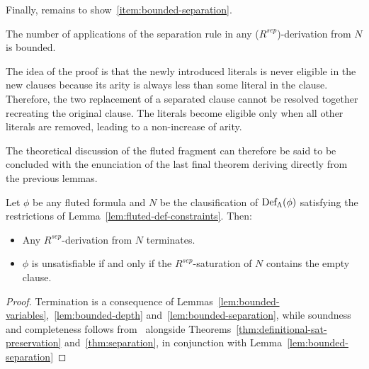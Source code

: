 Finally, remains to show~\ref{item:bounded-separation}.
\begin{lemma}\label{lem:bounded-separation}
  The number of applications of the separation rule in any (\(R^{sep}\))-derivation from \(N\) is bounded.
\end{lemma}

The idea of the proof is that the newly introduced literals is never eligible in the new clauses because its arity is always less than some literal in the clause.
Therefore, the two replacement of a separated clause cannot be resolved together recreating the original clause. The literals become eligible only when all other  literals are removed, leading to a non-increase of arity.

The theoretical discussion of the fluted fragment can therefore be said to be concluded with the enunciation of the last final theorem deriving directly from the previous lemmas.

\begin{theorem}
  Let \(\phi\) be any fluted formula and \(N\) be the clausification of \(\fldef{\Lambda}{\phi}\) satisfying the restrictions of Lemma~\ref{lem:fluted-def-constraints}.
  Then:
  \begin{itemize}
    \item Any \(R^{sep}\)-derivation from \(N\) terminates.
    \item \(\phi\) is unsatisfiable if and only if the \(R^{sep}\)-saturation of \(N\) contains the empty clause.
  \end{itemize}
\end{theorem}

\begin{proof}
  Termination is a consequence of Lemmas~\ref{lem:bounded-variables},~\ref{lem:bounded-depth} and~\ref{lem:bounded-separation}, while soundness and completeness follows from~\cite{robinson1965} alongside Theorems~\ref{thm:definitional-sat-preservation} and~\ref{thm:separation}, in conjunction with Lemma~\ref{lem:bounded-separation}
\end{proof}



